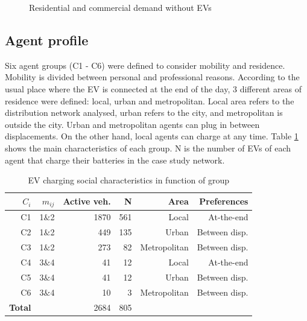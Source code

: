 \documentclass[a4paper,11pt,twoside,openright]{report}
\begin{document}
\begin{figure}[htbp]
	\centering
	\caption{Residential and commercial demand without EVs}
\end{figure}


\subsection{Agent profile} \label{sec:agent_profile}

Six agent groups (C1 - C6) were defined to consider mobility and residence. Mobility is divided between personal and professional reasons. According to the usual place where the EV is connected at the end of the day, 3 different areas of residence were defined: local, urban and metropolitan. Local area refers to the distribution network analysed, urban refers to the city, and metropolitan is outside the city. Urban and metropolitan agents can plug in between displacements. On the other hand, local agents can charge at any time. Table \ref{tab:CS_users} shows the main characteristics of each group. N is the number of EVs of each agent that charge their batteries in the case study network.

\begin{table} 
	\centering
	\caption{EV charging social characteristics in function of group} \label{tab:CS_users}
	\begin{tabular}{rrrrrr}
		
		{\bf $C_{i}$ } & {\bf $m_{ij}$ } & {\bf Active veh.} & {\bf N} &{\bf Area} & {\bf Preferences} \\
		\hline
		C1 &    1$\&$2 & 1870 & 561 & Local &   At-the-end \\
		
		C2 &    1$\&$2 & 449 & 135 & Urban & Between disp. \\
		
		C3 &    1$\&$2 & 273 & 82 & Metropolitan & Between disp. \\
		
		C4 & 3$\&$4 & 41 & 12 & Local &   At-the-end \\
		
		C5 & 3$\&$4 & 41 & 12 & Urban & Between disp. \\
		
		C6 & 3$\&$4 & 10 & 3 & Metropolitan & Between disp. \\
		\hline
		\textbf{Total} & & 2684 & 805 & & \\
		\hline
	\end{tabular}  
\end{table}
\end{document}
